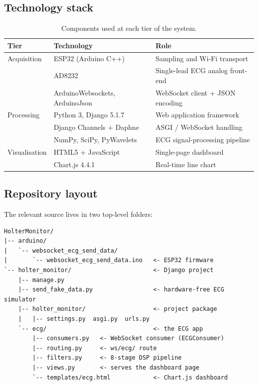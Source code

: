 \subsection{Technology stack}
\begin{table}[h]
  \centering
  \small
  \begin{tabular}{@{}lll@{}}
    \toprule
    \textbf{Tier} & \textbf{Technology} & \textbf{Role} \\
    \midrule
    Acquisition  & ESP32 (Arduino C++)        & Sampling and Wi-Fi transport \\
                 & AD8232                     & Single-lead ECG analog front-end \\
                 & ArduinoWebsockets, ArduinoJson & WebSocket client + JSON encoding \\
    Processing   & Python 3, Django 5.1.7     & Web application framework \\
                 & Django Channels + Daphne   & ASGI / WebSocket handling \\
                 & NumPy, SciPy, PyWavelets   & ECG signal-processing pipeline \\
    Visualisation& HTML5 + JavaScript         & Single-page dashboard \\
                 & Chart.js 4.4.1             & Real-time line chart \\
    \bottomrule
  \end{tabular}
  \caption{Components used at each tier of the system.}
  \label{tab:stack}
\end{table}

\subsection{Repository layout}
The relevant source lives in two top-level folders:
\begin{lstlisting}[style=base,numbers=none]
HolterMonitor/
|-- arduino/
|   `-- websocket_ecg_send_data/
|       `-- websocket_ecg_send_data.ino   <- ESP32 firmware
`-- holter_monitor/                       <- Django project
    |-- manage.py
    |-- send_fake_data.py                 <- hardware-free ECG simulator
    |-- holter_monitor/                   <- project package
    |   |-- settings.py  asgi.py  urls.py
    `-- ecg/                              <- the ECG app
        |-- consumers.py   <- WebSocket consumer (ECGConsumer)
        |-- routing.py     <- ws/ecg/ route
        |-- filters.py     <- 8-stage DSP pipeline
        |-- views.py       <- serves the dashboard page
        `-- templates/ecg.html            <- Chart.js dashboard
\end{lstlisting}
